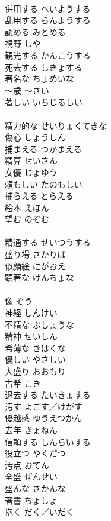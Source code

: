 \documentclass[8pt]{extreport}
\begin{document}
\begin{CJK}{UTF8}{min}
\\	併用する	へいようする	
\\	乱用する	らんようする	
\\	認める	みとめる	
\\	視野	しや	
\\	観光する	かんこうする	
\\	死去する	しきょする	
\\	著名な	ちょめいな	
\\	～歳	～さい	
\\	著しい	いちじるしい	
\\	[和語]
\\	精力的な	せいりょくてきな	
\\	傷心	しょうしん	
\\	捕まえる	つかまえる	
\\	精算	せいさん	
\\	女優	じょゆう	
\\	頼もしい	たのもしい	
\\	捕らえる	とらえる	
\\	絵本	えほん	
\\	望む	のぞむ	
\\	[和語]
\\	精通する	せいつうする	
\\	盛り場	さかりば	
\\	似顔絵	にがおえ	
\\	顕著な	けんちょな	
\\	[漢語]
\\	像	ぞう	
\\	神経	しんけい	
\\	不精な	ぶしょうな	
\\	精神	せいしん	
\\	希薄な	きはくな	
\\	優しい	やさしい	
\\	大盛り	おおもり	
\\	古希	こき	
\\	退去する	たいきょする	
\\	汚す	よごす／けがす	
\\	優越感	ゆうえつかん	
\\	去年	きょねん	
\\	信頼する	しんらいする	
\\	役立つ	やくだつ	
\\	汚点	おてん	
\\	全盛	ぜんせい	
\\	盛んな	さかんな	
\\	著書	ちょしょ	
\\	抱く	だく／いだく	

\end{CJK}
\end{document}
